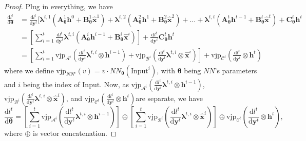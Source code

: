 \documentclass{article}
\newtheorem{proof}{Proof}
\newcommand{\A}{\mathcal{A}}
\newcommand{\B}{\mathcal{B}}
\newcommand{\C}{\mathcal{C}}
\newcommand{\vjp}{\mathrm{vjp}}
\newcommand{\diff}{\mathrm{d}}
\newcommand{\blambda}{\boldsymbol{\lambda}}
\begin{document}
\begin{proof}
Plug in everything, we have
\begin{align*}
    \frac{\diff l^t}{\diff\boldsymbol{\theta}} &= \frac{\diff l^t}{\diff \mathbf{y}^t}[\blambda^{t,1}(\mathbf{A}^1_{\boldsymbol{\theta}}\mathbf{h}^0+\mathbf{B}^1_{\boldsymbol{\theta}}\hat{\mathbf{x}}^1)+\blambda^{t,2}(\mathbf{A}^2_{\boldsymbol{\theta}}\mathbf{h}^1+\mathbf{B}^2_{\boldsymbol{\theta}}\hat{\mathbf{x}}^2)+\dots+\blambda^{t,t}(\mathbf{A}^t_{\boldsymbol{\theta}}\mathbf{h}^{t-1}+\mathbf{B}^t_{\boldsymbol{\theta}}\hat{\mathbf{x}}^t)+\mathbf{C}^t_{\boldsymbol{\theta}}\mathbf{h}^t\\
    &= \left[ \sum_{i=1}^{t}\frac{\diff l^t}{\diff \mathbf{y}^t}\blambda^{t,i}(\mathbf{A}^i_{\boldsymbol{\theta}}\mathbf{h}^{i-1}+\mathbf{B}^i_{\boldsymbol{\theta}}\hat{\mathbf{x}}^i) \right] +\frac{\diff l^t}{\diff \mathbf{y}^t}\mathbf{C}^t_{\boldsymbol{\theta}}\mathbf{h}^t\\
    &= \left[ \sum_{i=1}^{t}\vjp_{\boldsymbol{\A}^i}(\frac{\diff l^t}{\diff \mathbf{y}^t}\blambda^{t,i}\otimes \mathbf{h}^{i-1})+\vjp_{\boldsymbol{\B}^i}(\frac{\diff l^t}{\diff \mathbf{y}^t}\blambda^{t,i}\otimes \hat{\mathbf{x}}^i) \right] +\vjp_{\boldsymbol{\C}^t}(\frac{\diff l^t}{\diff \mathbf{y}^t}\otimes \mathbf{h}^t)
\end{align*}
where we define $\vjp_{NN^i}(v)=v\cdot NN_{\boldsymbol{\theta}}(\mathrm{Input}^i)$, with $\boldsymbol{\theta}$ being $NN$'s parameters and $i$ being the index of $\mathrm{Input}$. Now, as $\vjp_{\boldsymbol{\A}^i}(\frac{\diff l^t}{\diff \mathbf{y}^t}\blambda^{t,i}\otimes \mathbf{h}^{i-1})$, $\vjp_{\boldsymbol{\B}^i}(\frac{\diff l^t}{\diff \mathbf{y}^t}\blambda^{t,i}\otimes \hat{\mathbf{x}}^i)$, and $\vjp_{\boldsymbol{\C}^t}(\frac{\diff l^t}{\diff \mathbf{y}^t}\otimes \mathbf{h}^t)$are separate, we have 
\begin{equation}
    \frac{\diff l^t}{\diff\boldsymbol{\theta}} = \left[ \sum_{i=1}^{t}\vjp_{\boldsymbol{\A}^i}(\frac{\diff l^t}{\diff \mathbf{y}^t}\blambda^{t,i}\otimes \mathbf{h}^{i-1})\right ] \oplus \left [ \sum_{i=1}^{t}\vjp_{\boldsymbol{\B}^i}(\frac{\diff l^t}{\diff \mathbf{y}^t}\blambda^{t,i}\otimes \hat{\mathbf{x}}^i) \right ] \oplus \vjp_{\boldsymbol{\C}^t}(\frac{\diff l^t}{\diff \mathbf{y}^t}\otimes \mathbf{h}^t),
\end{equation}
where $\oplus$ is vector concatenation.
\end{proof}
\end{document}
